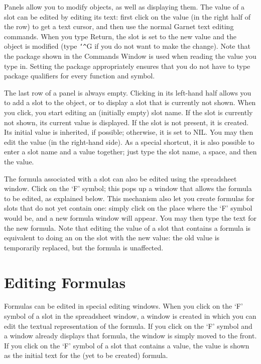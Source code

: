 Panels allow you to modify objects, as well as displaying them.  The value
of a slot can be edited by editing its text: first click on the value (in
the right half of the row) to get a text cursor, and then use the normal
Garnet text editing commands.  When you type Return, the slot is set to
the new value and the object is modified (type {\tt\char`\^}G if you do not want to
make the change).  Note that the package shown in the Commands Window is
used when reading the value you type in.  Setting the package
appropriately ensures that you do not have to type package qualifiers for
every function and symbol.

The last row of a panel is always empty.  Clicking in its left-hand half
allows you to add a slot to the object, or to display a slot that is
currently not shown.  When you click, you start editing an (initially
empty) slot name.  If the slot is currently not shown, its current value
is displayed.  If the slot is not present, it is created.  Its initial
value is inherited, if possible; otherwise, it is set to NIL.  You may
then edit the value (in the right-hand side).  As a special shortcut, it
is also possible to enter a slot name and a value together; just type the
slot name, a space, and then the value.

The formula associated with a slot can also be edited using the
spreadsheet window.  Click on the `F' symbol; this pops up a window that
allows the formula to be edited, as explained below.  This mechanism also
let you create formulas for slots that do not yet contain one: simply
click on the place where the `F' symbol would be, and a new formula window
will appear.  You may then type the text for the new formula.  Note that
editing the value of a slot that contains a formula is equivalent to doing
an  on the slot with the new value: the old value is
temporarily replaced, but the formula is unaffected.


\chapter{Editing Formulas}

Formulas can be edited in special editing windows.  When you click on the
`F' symbol of a slot in the spreadsheet window, a window is created in
which you can edit the textual representation of the formula.  If you
click on the `F' symbol and a window already displays that formula, the
window is simply moved to the front.  If you click on the `F' symbol of a
slot that contains a value, the value is shown as the initial text for the
(yet to be created) formula.


